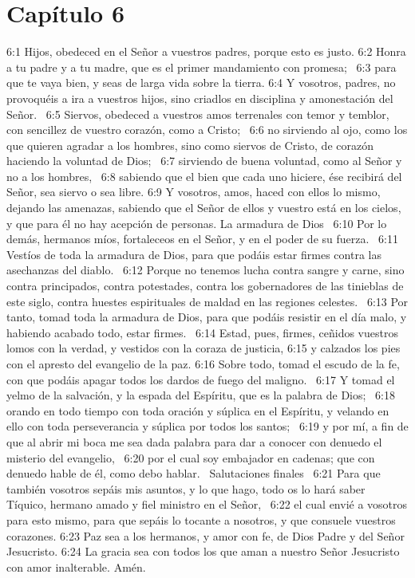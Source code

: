 \section*{Capítulo 6 }

6:1 Hijos, obedeced en el Señor a vuestros padres, porque esto es justo. 
6:2 Honra a tu padre y a tu madre, que es el primer mandamiento con promesa;  
6:3 para que te vaya bien, y seas de larga vida sobre la tierra. 
6:4 Y vosotros, padres, no provoquéis a ira a vuestros hijos, sino criadlos en disciplina y amonestación del Señor.  
6:5 Siervos, obedeced a vuestros amos terrenales con temor y temblor, con sencillez de vuestro corazón, como a Cristo;  
6:6 no sirviendo al ojo, como los que quieren agradar a los hombres, sino como siervos de Cristo, de corazón haciendo la voluntad de Dios;  
6:7 sirviendo de buena voluntad, como al Señor y no a los hombres,  
6:8 sabiendo que el bien que cada uno hiciere, ése recibirá del Señor, sea siervo o sea libre. 
6:9 Y vosotros, amos, haced con ellos lo mismo, dejando las amenazas, sabiendo que el Señor de ellos y vuestro está en los cielos, y que para él no hay acepción de personas. 
La armadura de Dios  
6:10 Por lo demás, hermanos míos, fortaleceos en el Señor, y en el poder de su fuerza.  
6:11 Vestíos de toda la armadura de Dios, para que podáis estar firmes contra las asechanzas del diablo.  
6:12 Porque no tenemos lucha contra sangre y carne, sino contra principados, contra potestades, contra los gobernadores de las tinieblas de este siglo, contra huestes espirituales de maldad en las regiones celestes.  
6:13 Por tanto, tomad toda la armadura de Dios, para que podáis resistir en el día malo, y habiendo acabado todo, estar firmes.  
6:14 Estad, pues, firmes, ceñidos vuestros lomos con la verdad, y vestidos con la coraza de justicia, 
6:15 y calzados los pies con el apresto del evangelio de la paz. 
6:16 Sobre todo, tomad el escudo de la fe, con que podáis apagar todos los dardos de fuego del maligno.  
6:17 Y tomad el yelmo de la salvación, y la espada del Espíritu, que es la palabra de Dios;  
6:18 orando en todo tiempo con toda oración y súplica en el Espíritu, y velando en ello con toda perseverancia y súplica por todos los santos;  
6:19 y por mí, a fin de que al abrir mi boca me sea dada palabra para dar a conocer con denuedo el misterio del evangelio,  
6:20 por el cual soy embajador en cadenas; que con denuedo hable de él, como debo hablar.  
Salutaciones finales  
6:21 Para que también vosotros sepáis mis asuntos, y lo que hago, todo os lo hará saber Tíquico, hermano amado y fiel ministro en el Señor,  
6:22 el cual envié a vosotros para esto mismo, para que sepáis lo tocante a nosotros, y que consuele vuestros corazones. 
6:23 Paz sea a los hermanos, y amor con fe, de Dios Padre y del Señor Jesucristo. 
6:24 La gracia sea con todos los que aman a nuestro Señor Jesucristo con amor inalterable. Amén.  